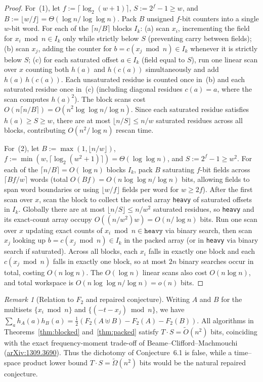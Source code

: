 \documentclass[11pt]{article}
\theoremstyle{plain}
\theoremstyle{definition}
\theoremstyle{remark}
\newtheorem{remark}{Remark}
\begin{document}
\begin{proof}
For~(1), let $f := \lceil \log_2(w+1) \rceil$, $S := 2^f - 1 \ge w$, and $B := \lfloor w / f \rfloor = \Theta(\log n / \log\log n)$.
Pack $B$ unsigned $f$-bit counters into a single $w$-bit word.
For each of the $\lceil n/B \rceil$ blocks $I_k$: (a) scan $x_i$, incrementing the field for $x_i \bmod n \in I_k$ only while strictly below $S$ (preventing carry between fields); (b) scan $x_j$, adding the counter for $b = c(x_j \bmod n) \in I_k$ whenever it is strictly below $S$; (c) for each saturated offset $a \in I_k$ (field equal to $S$), run one linear scan over $x$ counting both $h(a)$ and $h(c(a))$ simultaneously and add $h(a)\,h(c(a))$.
Each unsaturated residue is counted once in~(b) and each saturated residue once in~(c) (including diagonal residues $c(a)=a$, where the scan computes $h(a)^2$).
The block scans cost $O(n \lceil n/B \rceil) = O(n^2 \log\log n / \log n)$. Since each saturated residue satisfies $h(a) \ge S \ge w$, there are at most $\lfloor n/S \rfloor \le n/w$ saturated residues across all blocks, contributing $O(n^2/\log n)$ rescan time.

For~(2), let $B := \max(1, \lfloor n/w \rfloor)$, $f := \min(w, \lceil \log_2(w^2+1) \rceil) = \Theta(\log\log n)$, and $S := 2^f - 1 \ge w^2$.
For each of the $\lceil n/B \rceil = O(\log n)$ blocks $I_k$, pack $B$ saturating $f$-bit fields across $\lceil B f / w \rceil$ words (total $O(Bf) = O(n \log\log n / \log n)$ bits, allowing fields to span word boundaries or using $\lfloor w/f \rfloor$ fields per word for $w \ge 2f$).
After the first scan over $x$, scan the block to collect the sorted array \texttt{heavy} of saturated offsets in $I_k$. Globally there are at most $\lfloor n/S \rfloor \le n/w^2$ saturated residues, so \texttt{heavy} and its exact-count array occupy $O((n/w^2) w) = O(n/\log n)$ bits.
Run one scan over $x$ updating exact counts of $x_i \bmod n \in \texttt{heavy}$ via binary search, then scan $x_j$ looking up $b = c(x_j \bmod n) \in I_k$ in the packed array (or in \texttt{heavy} via binary search if saturated).
Across all blocks, each $x_i$ falls in exactly one block and each $c(x_j \bmod n)$ falls in exactly one block, so at most $2n$ binary searches occur in total, costing $O(n\log n)$. The $O(\log n)$ linear scans also cost $O(n\log n)$, and total workspace is $O(n \log\log n / \log n) = o(n)$ bits.
\end{proof}

\begin{remark}[Relation to $F_2$ and repaired conjecture]
Writing $A$ and $B$ for the multisets $\{x_i \bmod n\}$ and $\{(-t - x_j) \bmod n\}$, we have $\sum_a h_A(a) h_B(a) = \frac{1}{2}(F_2(A \uplus B) - F_2(A) - F_2(B))$.
All algorithms in Theorems~\ref{thm:blocked} and~\ref{thm:packed} satisfy $T \cdot S = \tilde{O}(n^2)$ bits, coinciding with the exact frequency-moment trade-off of Beame--Clifford--Machmouchi (\href{https://arxiv.org/abs/1309.3690}{arXiv:1309.3690}).
Thus the dichotomy of Conjecture~6.1 is false, while a time--space product lower bound $T \cdot S = \tilde{\Omega}(n^2)$ bits would be the natural repaired conjecture.
\end{remark}
\end{document}
